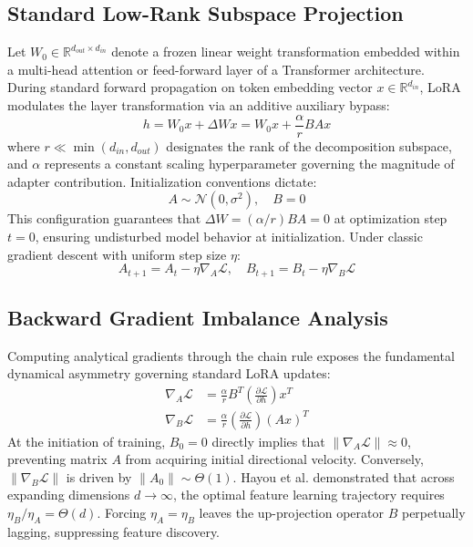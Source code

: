 \documentclass[conference]{IEEEtran}
\begin{document}
\subsection{Standard Low-Rank Subspace Projection}
Let $W_0 \in \mathbb{R}^{d_{out} \times d_{in}}$ denote a frozen linear weight transformation embedded within a multi-head attention or feed-forward layer of a Transformer architecture. During standard forward propagation on token embedding vector $x \in \mathbb{R}^{d_{in}}$, LoRA modulates the layer transformation via an additive auxiliary bypass:
\begin{equation}
h = W_0 x + \Delta W x = W_0 x + \frac{\alpha}{r} B A x
\end{equation}
where $r \ll \min(d_{in}, d_{out})$ designates the rank of the decomposition subspace, and $\alpha$ represents a constant scaling hyperparameter governing the magnitude of adapter contribution. Initialization conventions dictate:
\begin{equation}
A \sim \mathcal{N}(0, \sigma^2), \quad B = 0
\end{equation}
This configuration guarantees that $\Delta W = (\alpha/r)BA = 0$ at optimization step $t=0$, ensuring undisturbed model behavior at initialization. Under classic gradient descent with uniform step size $\eta$:
\begin{equation}
A_{t+1} = A_t - \eta \nabla_{A} \mathcal{L}, \quad B_{t+1} = B_t - \eta \nabla_{B} \mathcal{L}
\end{equation}

\subsection{Backward Gradient Imbalance Analysis}
Computing analytical gradients through the chain rule exposes the fundamental dynamical asymmetry governing standard LoRA updates:
\begin{align}
\nabla_A \mathcal{L} &= \frac{\alpha}{r} B^T \left(\frac{\partial \mathcal{L}}{\partial h}\right) x^T \\
\nabla_B \mathcal{L} &= \frac{\alpha}{r} \left(\frac{\partial \mathcal{L}}{\partial h}\right) (A x)^T
\end{align}
At the initiation of training, $B_0 = 0$ directly implies that $\|\nabla_A \mathcal{L}\| \approx 0$, preventing matrix $A$ from acquiring initial directional velocity. Conversely, $\|\nabla_B \mathcal{L}\|$ is driven by $\|A_0\| \sim \Theta(1)$. Hayou et al. \cite{hayou2024loraplus} demonstrated that across expanding dimensions $d \to \infty$, the optimal feature learning trajectory requires $\eta_B / \eta_A = \Theta(d)$. Forcing $\eta_A = \eta_B$ leaves the up-projection operator $B$ perpetually lagging, suppressing feature discovery.
\end{document}
